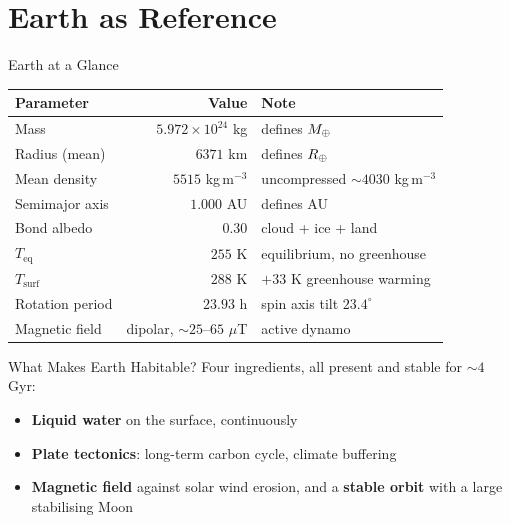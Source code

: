 \documentclass[aspectratio=169, 11pt]{beamer}
\begin{document}
\begin{frame}
\end{frame}

\section{Earth as Reference}

\begin{frame}{Earth at a Glance}
  \centering
  \small
  \begin{tabular}{l r l}
    \toprule
    \textbf{Parameter} & \textbf{Value} & \textbf{Note} \\
    \midrule
    Mass & $5.972 \times 10^{24}$ kg & defines $M_{\oplus}$ \\
    Radius (mean) & $6371$ km & defines $R_{\oplus}$ \\
    Mean density & $5515$ kg\,m$^{-3}$ & uncompressed $\sim 4030$ kg\,m$^{-3}$ \\
    Semimajor axis & $1.000$ AU & defines AU \\
    Bond albedo & $0.30$ & cloud + ice + land \\
    $T_{\mathrm{eq}}$ & $255$ K & equilibrium, no greenhouse \\
    $T_{\mathrm{surf}}$ & $288$ K & $+33$ K greenhouse warming \\
    Rotation period & $23.93$ h & spin axis tilt $23.4^\circ$ \\
    Magnetic field & dipolar, $\sim 25$--$65$ $\mu$T & active dynamo \\
    \bottomrule
  \end{tabular}
  \vskip6pt
\end{frame}

\begin{frame}{What Makes Earth Habitable?}
  Four ingredients, all present and stable for $\sim 4$ Gyr:
  \vskip6pt
  \begin{itemize}
    \item \textbf{Liquid water} on the surface, continuously
    \item \textbf{Plate tectonics}: long-term carbon cycle, climate buffering
    \item \textbf{Magnetic field} against solar wind erosion, and a \textbf{stable orbit} with a large stabilising Moon
  \end{itemize}
  \vskip6pt
\end{frame}
\end{document}
